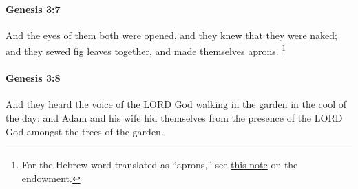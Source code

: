 		\paragraph{Genesis 3:7} %
			\label{GENESIS-3-7}

			And the eyes of them both were opened, and they knew that they were naked; and they sewed fig leaves together, and made themselves aprons.%
				\footnote{%
					For the Hebrew word translated as ``aprons,'' see \hyperref[ENDOWMENT-aprons]{this note} on the endowment.
					}


		\paragraph{Genesis 3:8} %
			\label{GENESIS-3-8}

			And they heard the voice of the LORD God walking in the garden in the cool of the day: and Adam and his wife hid themselves from the presence of the LORD God amongst the trees of the garden.

